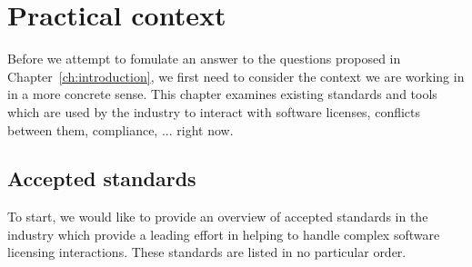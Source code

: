 
\chapter{Practical context}\label{ch:background}

Before we attempt to fomulate an answer to the questions proposed in Chapter~\ref{ch:introduction}, we first need to consider the context we are working in in a more concrete sense. This chapter examines existing standards and tools which are used by the industry to interact with software licenses, conflicts between them, compliance, ... right now.

\section{Accepted standards}\label{sec:context:standards}

To start, we would like to provide an overview of accepted standards in the industry which provide a leading effort in helping to handle complex software licensing interactions. These standards are listed in no particular order.

